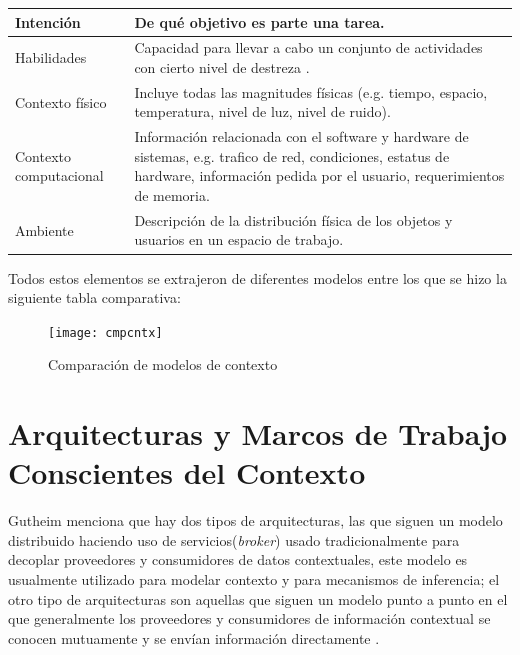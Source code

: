 \begin{center}
\begin{longtable}{|p{3cm}|p{10cm}|}
	\hline
	Intenci\'on & De qu\'e objetivo es parte una tarea\cite{gallardo2012framework}. \\
	\hline
	Habilidades & Capacidad para llevar a cabo un conjunto de actividades con cierto nivel de destreza \cite{decouchant2013adapting}. \\
	\hline
	Contexto f\'isico & Incluye todas las magnitudes f\'isicas (e.g. tiempo, espacio, temperatura, nivel de luz, nivel de ruido)\cite{hoyos2013domain}. \\
	\hline
	Contexto computacional & Informaci\'on relacionada con el software y hardware de sistemas, e.g. trafico de red, condiciones, estatus de hardware, informaci\'on pedida por el usuario, requerimientos de memoria\cite{hoyos2013domain}. \\
	\hline
	Ambiente & Descripci\'on de la distribuci\'on f\'isica de los objetos y usuarios en un espacio de trabajo\cite{hoyos2013domain}. \\
	\hline
\end{longtable}
\end{center}

Todos estos elementos se extrajeron de diferentes modelos entre los que se hizo la siguiente tabla comparativa:

\begin{figure}[h!]
  \centering
    \texttt{[image: cmpcntx]}
  \caption{Comparaci\'on de modelos de contexto\cite{ellis1994conceptual}\cite{montane2013context}\cite{gallardo2012framework}}
\end{figure}


\section{Arquitecturas y Marcos de Trabajo Conscientes del Contexto}

Gutheim \cite{gutheim2011} menciona que hay dos tipos de arquitecturas, las que siguen un modelo distribuido haciendo uso de servicios(\textit{broker}) usado tradicionalmente para decoplar proveedores y consumidores de datos contextuales, este modelo es usualmente utilizado para  modelar contexto y para mecanismos de inferencia; el otro tipo de arquitecturas son aquellas que siguen un modelo punto a punto en el que generalmente los proveedores y consumidores de informaci\'on contextual se conocen mutuamente y se env\'ian informaci\'on directamente \cite{yoosoo2010}.

